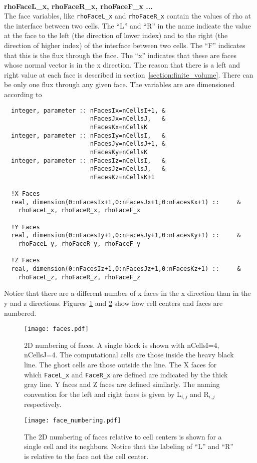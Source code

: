 \ \ \\
{\bf rhoFaceL\_x, rhoFaceR\_x, rhoFaceF\_x ...}  \\
The face variables, like 
{\tt rhoFaceL\_x} and {\tt rhoFaceR\_x} contain the values of rho at the
interface between two cells.  The ``L'' and ``R'' in the name indicate
the value at the face to the left (the direction of lower index) and
to the right (the direction of higher index) of the interface between two
cells. 
The ``F'' indicates that this is the flux through the face. The ``x''
indicates that these are faces whose normal vector is in the x direction.
The reason that there is a left and right value at each face 
is described in section~\ref{section:finite_volume}.  There can be
only one flux through any given face.  The variables are
are dimensioned according to
\begin{verbatim}
  integer, parameter :: nFacesIx=nCellsI+1, &
                        nFacesJx=nCellsJ,   &
                        nFacesKx=nCellsK
  integer, parameter :: nFacesIy=nCellsI,   &
                        nFacesJy=nCellsJ+1, &
                        nFacesKy=nCellsK
  integer, parameter :: nFacesIz=nCellsI,   &
                        nFacesJz=nCellsJ,   &
                        nFacesKz=nCellsK+1

  !X Faces
  real, dimension(0:nFacesIx+1,0:nFacesJx+1,0:nFacesKx+1) ::     &
    rhoFaceL_x, rhoFaceR_x, rhoFaceF_x

  !Y Faces
  real, dimension(0:nFacesIy+1,0:nFacesJy+1,0:nFacesKy+1) ::     &
    rhoFaceL_y, rhoFaceR_y, rhoFaceF_y

  !Z Faces
  real, dimension(0:nFacesIz+1,0:nFacesJz+1,0:nFacesKz+1) ::     &
    rhoFaceL_z, rhoFaceR_z, rhoFaceF_z
\end{verbatim}
Notice that there are a different number of x faces in the x direction
than in the y and z directions. Figures~\ref{fig:faces1} and \ref{fig:faces2}
show how cell centers and faces are numbered.
\begin{figure}
\begin{center}
\texttt{[image: faces.pdf]}
\end{center}
\caption{2D numbering of faces.  A single block is shown with nCellsI=4, nCellsJ=4.
The computational cells are those inside the heavy black line.  The ghost cells are those
outside the line.  The X faces for which {\tt FaceL\_x} and {\tt FaceR\_x} are defined
are indicated by the thick gray line.  Y faces and Z faces
are defined similarly.  The naming convention for the left and right faces is given by 
L$_{i,j}$ and R$_{i,j}$ respectively.}
\label{fig:faces1}
\end{figure}
\begin{figure}
\begin{center}
\texttt{[image: face\_numbering.pdf]}
\end{center}
\caption{The 2D numbering of faces relative to cell centers 
is shown for a single cell and its 
neghbors.  Notice that the labeling of ``L'' and ``R'' is relative to the face not
the cell center.}  
\label{fig:faces2}
\end{figure}

